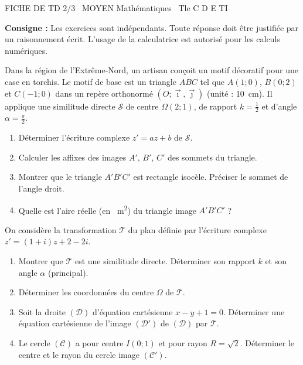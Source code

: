 \documentclass[11pt]{article}
\begin{document}
\begin{tcolorbox}[enhanced,colback=popink,colframe=popink,arc=10pt,boxrule=0pt,left=12pt,right=12pt,top=9pt,bottom=9pt]
{\color{white}\popxbold\small FICHE DE TD 2/3 \textbullet\ MOYEN \hfill Mathématiques \textbullet\ Tle C D E TI\par}
\end{tcolorbox}
\vspace{4pt}
\noindent \textbf{Consigne :} Les exercices sont indépendants. Toute réponse doit être justifiée par un raisonnement écrit. L'usage de la calculatrice est autorisé pour les calculs numériques.

\begin{exercice}
Dans la région de l'Extrême-Nord, un artisan conçoit un motif décoratif pour une case en torchis. Le motif de base est un triangle $ABC$ tel que $A(1;0)$, $B(0;2)$ et $C(-1;0)$ dans un repère orthonormé $(O;\vec{\imath},\vec{\jmath})$ (unité : \SI{10}{cm}). Il applique une similitude directe $\mathcal{S}$ de centre $\Omega(2;1)$, de rapport $k=\frac{1}{2}$ et d'angle $\alpha = \frac{\pi}{2}$.
\begin{enumerate}
    \item Déterminer l'écriture complexe $z' = az + b$ de $\mathcal{S}$.
    \item Calculer les affixes des images $A'$, $B'$, $C'$ des sommets du triangle.
    \item Montrer que le triangle $A'B'C'$ est rectangle isocèle. Préciser le sommet de l'angle droit.
    \item Quelle est l'aire réelle (en \SI{}{m^2}) du triangle image $A'B'C'$ ?
\end{enumerate}
\end{exercice}

\begin{exercice}
On considère la transformation $\mathcal{T}$ du plan définie par l'écriture complexe $z' = (1+i)z + 2 - 2i$.
\begin{enumerate}
    \item Montrer que $\mathcal{T}$ est une similitude directe. Déterminer son rapport $k$ et son angle $\alpha$ (principal).
    \item Déterminer les coordonnées du centre $\Omega$ de $\mathcal{T}$.
    \item Soit la droite $(\mathcal{D})$ d'équation cartésienne $x - y + 1 = 0$. Déterminer une équation cartésienne de l'image $(\mathcal{D}')$ de $(\mathcal{D})$ par $\mathcal{T}$.
    \item Le cercle $(\mathcal{C})$ a pour centre $I(0;1)$ et pour rayon $R = \sqrt{2}$. Déterminer le centre et le rayon du cercle image $(\mathcal{C}')$.
\end{enumerate}
\end{exercice}
\end{document}
